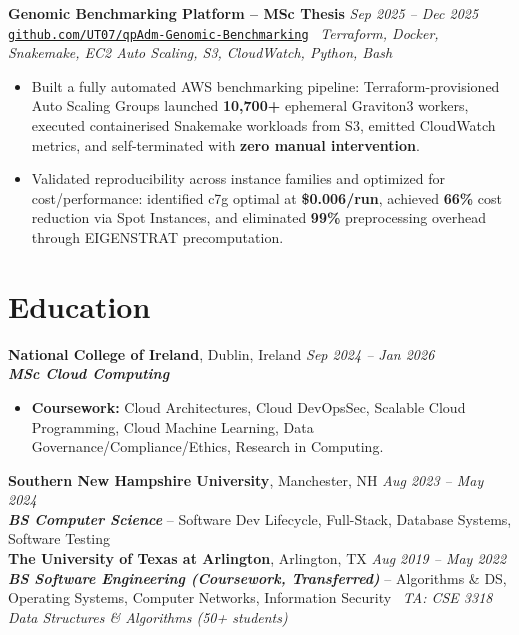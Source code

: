 \documentclass[10pt,a4paper]{article}
\newcommand{\projectentryurl}[5]{%
  \Needspace{3\baselineskip}%
  \textbf{#1} \hfill \textit{#2}\\[-0.15em]
  {\small\href{#3}{\texttt{#4}}} \textbar\ \textit{#5}\\[-0.25em]
}
\begin{document}
\vspace{0.10em}
\projectentryurl{Genomic Benchmarking Platform -- MSc Thesis}{Sep 2025 -- Dec 2025}{https://github.com/UT07/Performance-Optimization-and-Cost-Analysis-of-qpAdm-Genomic-Modeling}{github.com/UT07/qpAdm-Genomic-Benchmarking}{Terraform, Docker, Snakemake, EC2 Auto Scaling, S3, CloudWatch, Python, Bash}
\begin{itemize}
  \item Built a fully automated AWS benchmarking pipeline: Terraform-provisioned Auto Scaling Groups launched \textbf{10,700+} ephemeral Graviton3 workers, executed containerised Snakemake workloads from S3, emitted CloudWatch metrics, and self-terminated with \textbf{zero manual intervention}.
  \item Validated reproducibility across instance families and optimized for cost/performance: identified c7g optimal at \textbf{\$0.006/run}, achieved \textbf{66\%} cost reduction via Spot Instances, and eliminated \textbf{99\%} preprocessing overhead through EIGENSTRAT precomputation.
\end{itemize}

\section*{Education}
\textbf{National College of Ireland}, Dublin, Ireland \hfill \textit{Sep 2024 -- Jan 2026}\\[-0.15em]
\textbf{\textit{MSc Cloud Computing}}\\[-0.25em]
\begin{itemize}
  \item \textbf{Coursework:} Cloud Architectures, Cloud DevOpsSec, Scalable Cloud Programming, Cloud Machine Learning, Data Governance/Compliance/Ethics, Research in Computing.
\end{itemize} 

\vspace{0.12em}
\textbf{Southern New Hampshire University}, Manchester, NH \hfill \textit{Aug 2023 -- May 2024}\\[-0.15em]
\textbf{\textit{BS Computer Science}} -- Software Dev Lifecycle, Full-Stack, Database Systems, Software Testing\\[0.05em]

\textbf{The University of Texas at Arlington}, Arlington, TX \hfill \textit{Aug 2019 -- May 2022}\\[-0.15em]
\textbf{\textit{BS Software Engineering (Coursework, Transferred)}} -- Algorithms \& DS, Operating Systems, Computer Networks, Information Security \textbar\ \textit{TA: CSE 3318 Data Structures \& Algorithms (50+ students)}
\end{document}
